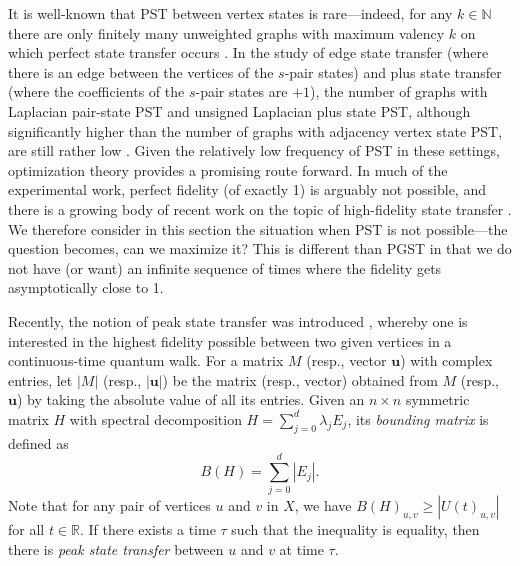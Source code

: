 \documentclass{article}
\numberwithin{equation}{section}
\newcommand{\bu}{\mathbf u}
\def\R{\mathbb{R}}
\begin{document}
{It is well-known that PST between vertex states is rare---indeed,  for any   $k\in \mathbb N$ there are
only finitely many unweighted graphs with maximum valency $k$ on which perfect
state transfer occurs \cite{godsil2012can}. In the study of edge state transfer (where there is an edge between the vertices of the $s$-pair states) and plus state transfer (where the coefficients of the $s$-pair states are $+1$), the number of graphs with  Laplacian pair-state PST and unsigned Laplacian plus
state PST, although significantly higher than the number of graphs with  adjacency vertex
state PST, are still rather low \cite[Table 3]{Chen2020PairST}. Given the relatively low frequency of PST in these settings, optimization theory provides a promising route forward. In much of the experimental work, perfect fidelity (of exactly 1) is arguably not possible, and there is a growing body of recent work on the topic of high-fidelity state transfer \cite{chen2016asymptotically, coutinho2025peak, lippner2024quantifying, lippner2025strong, vinet2024quantum}. We therefore consider in this section the situation   when PST is not possible---the question becomes, can we maximize it? This is different
than PGST in that we do not have (or want) an infinite sequence of times where the fidelity gets asymptotically close to 1. 

Recently, the notion of peak state transfer was introduced \cite{coutinho2025peak}, whereby one is interested in the highest fidelity possible between two given vertices in a continuous-time quantum walk. For a matrix $M$ (resp., vector $\bu$) with complex entries, let $|M|$ (resp., $|\bu|$) be the matrix (resp., vector) obtained from $M$ (resp., $\bu$) by taking the absolute value of all its entries. Given an $n\times n$ symmetric matrix $H$ with spectral decomposition $H=\sum_{j=0}^d\lambda_jE_j$, its \textit{bounding matrix} is defined as 
\begin{equation*}
B(H)=\sum_{j=0}^d|E_j|.
\end{equation*}
Note that for any pair of vertices $u$ and $v$ in $X$, we have $B(H)_{u,v}\geq |U(t)_{u,v}|$ for all $t\in\R$. If there exists a time $\tau$ such that the inequality is equality, then there is \textit{peak state transfer} between $u$ and $v$  at time $\tau$.


}
\end{document}
